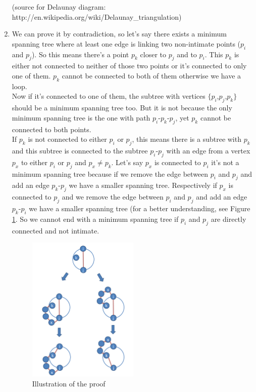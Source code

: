 \begin{enumerate}
(source for Delaunay diagram: http://en.wikipedia.org/wiki/Delaunay\_triangulation)
\item We can prove it by contradiction, so let's say there exists a minimum spanning tree where at least one edge is linking two non-intimate points ($p_i$ and $p_j$). So this means there's a point $p_k$ closer to $p_j$ and to $p_i$. This $p_k$ is either not connected to neither of those two points or it's connected to only one of them. $p_k$ cannot be connected to both of them otherwise we have a loop.\\
Now if it's connected to one of them, the subtree with vertices $\{$$p_i$,$p_j$,$p_k$$\}$ should be a minimum spanning tree too. But it is not because the only minimum spanning tree is the one with path $p_i$-$p_k$-$p_j$, yet $p_k$ cannot be connected to both points.\\
If $p_k$ is not connected to either $p_i$ or $p_j$, this means there is a subtree with $p_k$ and this subtree is connected to the subtree $p_i$-$p_j$ with an edge from a vertex $p_x$ to either $p_i$ or $p_j$ and $p_x \neq p_k$. Let's say $p_x$ is connected to $p_i$ it's not a minimum spanning tree because if we remove the edge between $p_i$ and $p_j$ and add an edge $p_k$-$p_j$ we have a smaller spanning tree. Respectively if $p_x$ is connected to $p_j$ and we remove the edge between $p_i$ and $p_j$ and add an edge $p_k$-$p_i$ we have a smaller spanning tree (for a better understanding, see Figure \ref{fig:q12}. So we cannot end with a minimum spanning tree if $p_i$ and $p_j$ are directly connected and not intimate.
\begin{figure}[ht]
  \centering
\includegraphics[width=0.5\textwidth]{q12}%
\caption{Illustration of the proof}%
\label{fig:q12}%
\end{figure}
\clearpage
\end{enumerate}